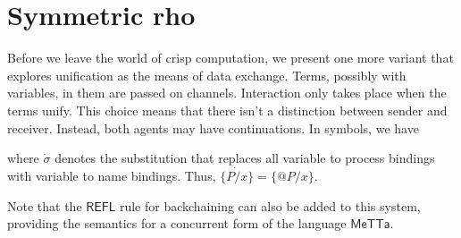 \section{Symmetric rho}

Before we leave the world of crisp computation, we present one more
variant that explores unification as the means of data
exchange. Terms, possibly with variables, in them are passed on
channels. Interaction only takes place when the terms unify. This
choice means that there isn't a distinction between sender and
receiver. Instead, both agents may have continuations. In symbols, we have




where $\dot{\sigma}$ denotes the substitution that replaces all variable to process bindings with variable to name bindings. Thus, $\dot{\{P / x\}} = \{\mathsf{@}P / x\}$.

Note that the $\mathsf{REFL}$ rule for backchaining can also be added
to this system, providing the semantics for a concurrent form of the
language $\mathsf{MeTTa}$.
